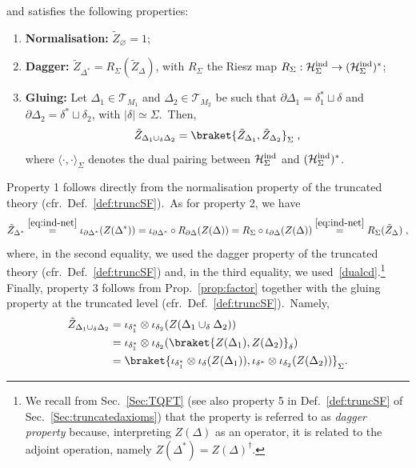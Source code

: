 \documentclass[11pt]{article}
\newcommand{\Hind}{\mathcal{H}_{\Sigma}^{\rm ind}}
\newcommand{\h}{\mathcal{H}}
\theoremstyle{definition}
\numberwithin{equation}{section}
\begin{document}
and satisfies the following properties:
\begin{enumerate}
    \item \textbf{Normalisation:} $\tilde{Z}_{\varnothing}=1$;
    \item \textbf{Dagger:} $\tilde{Z}_{\Delta^*}=R_{\Sigma}(\tilde{Z}_{\Delta})$, with $R_{\Sigma}$ the Riesz map $R_{\Sigma}:\Hind\to(\Hind)^*$;
    \item \textbf{Gluing:} Let $\Delta_1\in\mathcal{T}_{M_1}$ and $\Delta_2\in\mathcal{T}_{M_2}$ be such that $\partial\Delta_1=\delta_1^*\sqcup\delta$ and $\partial\Delta_2=\delta^*\sqcup\delta_2$, with $|\delta|\simeq \Sigma$.~Then,
    $$
    \tilde{Z}_{\Delta_1\cup_{\delta}\Delta_2}=\braket{\tilde{Z}_{\Delta_1},\tilde{Z}_{\Delta_2}}_{\Sigma}\;,
    $$
    where $\langle\cdot,\cdot\rangle_{\Sigma}$ denotes the dual pairing between $\h_{\Sigma}^{\rm ind}$ and $(\h_{\Sigma}^{\rm ind})^*$.
\end{enumerate}

Property 1 follows directly from the normalisation property of the truncated theory (cfr.~Def.~\ref{def:truncSF}).~As for property 2, we have
$$
\tilde{Z}_{\Delta^*}\overset{\eqref{eq:ind-net}}{=}\iota_{\partial\Delta^*}(Z(\Delta^*))=\iota_{\partial\Delta^*}\circ R_{\partial\Delta}(Z(\Delta))=R_{\Sigma}\circ\iota_{\partial\Delta}({Z}(\Delta))\overset{\eqref{eq:ind-net}}{=}R_{\Sigma}(\tilde{Z}_{\Delta})\;,
$$
where, in the second equality, we used the dagger property of the truncated theory (cfr.~Def.~\ref{def:truncSF}) and, in the third equality, we used~\eqref{dualcd}.\footnote{We recall from Sec.~\ref{Sec:TQFT} (see also property 5 in Def.~\ref{def:truncSF} of Sec.~\ref{Sec:truncatedaxioms}) that the property is referred to as \emph{dagger property} because, interpreting $Z(\Delta)$ as an operator, it is related to the adjoint operation, namely $Z(\Delta^*)=Z(\Delta)^\dagger$.} Finally, property 3 follows from Prop.~\ref{prop:factor} together with the gluing property at the truncated level (cfr.~Def.~\ref{def:truncSF}).~Namely,
\begin{equation}
    \begin{split}
        \tilde{Z}_{\Delta_1\cup_{\delta}\Delta_2}&=\iota_{\delta_1^*}\otimes\iota_{\delta_2}({Z}(\Delta_1\cup_{\delta}\Delta_2))\\
        &=\iota_{\delta_1^*}\otimes\iota_{\delta_2}(\braket{Z(\Delta_1),Z(\Delta_2)}_{\delta})\\
        &=\braket{\iota_{\delta_1^*}\otimes\iota_{\delta}(Z(\Delta_1)),\iota_{\delta^*}\otimes\iota_{\delta_2}(Z(\Delta_2))}_{\Sigma}.
    \end{split}
\end{equation}
    
\end{document}
